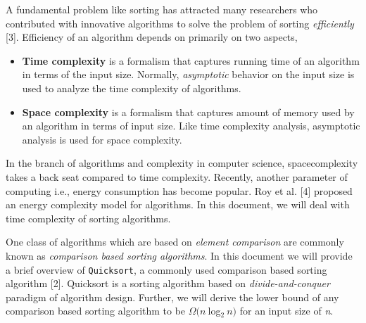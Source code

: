 \documentclass[a4paper, 10pt,twocolumn]{article}
\begin{document}
A fundamental problem like sorting has attracted many researchers who contributed with innovative algorithms to solve the problem of sorting \textit{efficiently} [3]. Efficiency of an algorithm depends on primarily on two aspects,
\begin{itemize}
  \item \textbf{Time complexity} is a formalism that captures running time of an algorithm in terms of the input size. Normally, \textit{asymptotic} behavior on the input size is used to analyze the time complexity of algorithms.
  \item \textbf{Space complexity} is a formalism that captures amount of memory used by an algorithm in terms of input size. Like time complexity analysis, asymptotic analysis is used for space complexity.
\end{itemize}
In the branch of algorithms and complexity in computer science,  spacecomplexity takes a back seat compared to time complexity. Recently, another parameter of computing i.e., energy consumption has become popular. Roy et al. [4] proposed an energy complexity model for algorithms. In this document, we will deal with time complexity of sorting algorithms.

One class of algorithms which are based on \textit{element comparison} are commonly known as \textit{comparison based sorting algorithms}. In this document we will provide a brief overview of \texttt{Quicksort}, a commonly used comparison based sorting algorithm [2]. Quicksort is a sorting algorithm based on \textit{divide-and-conquer} paradigm of algorithm design. Further, we will derive the lower bound of any comparison based sorting algorithm to be $\Omega(\textit{n} \ $log$_{2} \ \textit{n})$ for an input size of \textit{n}.
\end{document}

